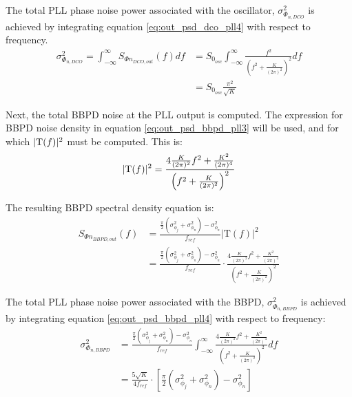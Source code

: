 			The total PLL phase noise power associated with the oscillator, $\sigma_{\Phi_{n,DCO}}^2$ is achieved by integrating equation \ref{eq:out_psd_dco_pll4} with respect to frequency.
			\begin{align}\label{eq:out_psd_dco_pll5} 
				\sigma_{\Phi_{n,DCO}}^2 =
				\int_{-\infty}^{\infty} S_{\Phi n_{DCO,out}}(f)df &=
				S_{0_{osc}}\int_{-\infty}^{\infty}\frac{f^2}{\left(f^2+\frac{K}{(2\pi)^2}\right)^2}df
				\\ &= S_{0_{osc}}\frac{\pi^2}{\sqrt{K}} 
			\end{align} 

			Next, the total BBPD noise at the PLL output is computed. The expression for BBPD noise density in equation \ref{eq:out_psd_bbpd_pll3} will be used, and for which $|\textnormal{T}(f)|^2$ must be computed. This is: 
			\begin{equation} 
				|\textnormal{T}(f)|^2 =
				\frac{4\frac{K}{(2\pi)^2}f^2 +
				\frac{K^2}{(2\pi)^4}}{\left(f^2+\frac{K}{(2\pi)^2}\right)^2} 
			\end{equation}

			The resulting BBPD spectral density equation is:
			\begin{align}\label{eq:out_psd_bbpd_pll4} 
				S_{\Phi n_{BBPD,out}}(f) & =
				\frac{\frac{\pi}{2}(\sigma^2_{\phi_j} +
				\sigma^2_{\phi_n})-\sigma^2_{\phi_n}}{f_{ref}}\left|\mathrm{T}(f)\right|^2
				\\&= \frac{\frac{\pi}{2}(\sigma^2_{\phi_j} +
				\sigma^2_{\phi_n})-\sigma^2_{\phi_n}}{f_{ref}}\cdot\frac{4\frac{K}{(2\pi)^2}f^2
				+ \frac{K^2}{(2\pi)^4}}{\left(f^2+\frac{K}{(2\pi)^2}\right)^2} 
			\end{align} 

			The total PLL phase noise power associated with the BBPD, $\sigma_{\Phi_{n,BBPD}}^2$ is achieved by integrating equation \ref{eq:out_psd_bbpd_pll4} with respect to frequency:
			\begin{align}\label{eq:out_psd_bbpd_pll5} 
				\sigma_{\Phi_{n,BBPD}}^2 & =
				\frac{\frac{\pi}{2}(\sigma^2_{\phi_j} +
				\sigma^2_{\phi_n})-\sigma^2_{\phi_n}}{f_{ref}}\int_{-\infty}^{\infty}\frac{4\frac{K}{(2\pi)^2}f^2
				+ \frac{K^2}{(2\pi)^4}}{\left(f^2+\frac{K}{(2\pi)^2}\right)^2}df\\ 
				&= \frac{5\sqrt{K}}{4f_{ref}}\cdot\left[\frac{\pi}{2}(\sigma^2_{\phi_j} +
				\sigma^2_{\phi_n})-\sigma^2_{\phi_n}\right] 
			\end{align} 

